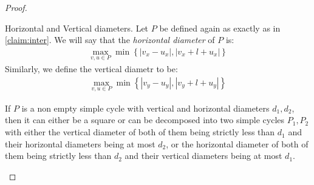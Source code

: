 \begin{proof}
\begin{figure}[h]
\end{figure}

  \begin{definition}
    Horizontal and Vertical diameters. Let $P$ be defined again as exactly as in \cref{claim:inter}. We will say that the \textit{horizontal diameter} of $P$ is: 
    \begin{equation*}
      \begin{split}
        \max_{v,u\in P} \min{ \left\{  | v_{x} -u_{x}|, |v_{x} + l + u_{x}| \right\} }  
      \end{split}
    \end{equation*}
    Similarly, we define the vertical diametr to be: 
    \begin{equation*}
      \begin{split}
        \max_{v,u\in P} \min{ \left\{  | v_{y} -u_{y}|, |v_{y} + l + u_{y}| \right\} }  
      \end{split}
    \end{equation*}
  \end{definition}

  \begin{claim} \label{claim:reduce}
If $P$ is a non empty simple cycle with vertical and horizontal diameters $d_{1}, d_{2}$, then it can either be a square or can be decomposed into two simple cycles $P_{1},P_{2}$ with either the vertical diameter of both of them being strictly less than $d_{1}$ and their horizontal diameters being at most $d_{2}$, or the horizontal diameter of both of them being strictly less than $d_{2}$ and their vertical diameters being at most $d_{1}$.
  \end{claim}


\end{proof}
